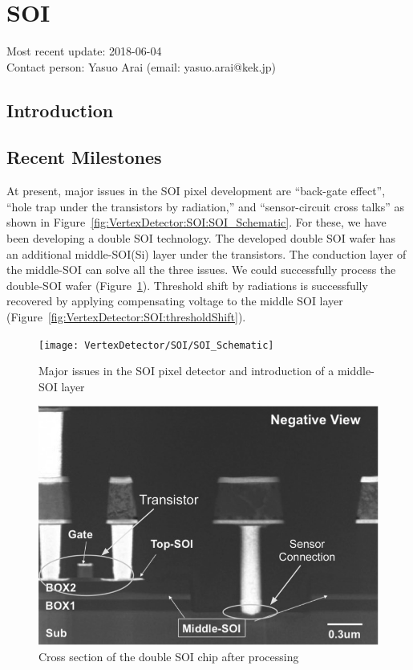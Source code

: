 \section{SOI}
Most recent update: 2018-06-04 \\
Contact person: Yasuo Arai (email: yasuo.arai@kek.jp)
\subsection{Introduction}
\subsection{Recent Milestones}
At present, major issues in the SOI pixel development are ``back-gate effect'', ``hole trap under the transistors by radiation,'' and ``sensor-circuit cross talks'' as shown in Figure~\ref{fig:VertexDetector:SOI:SOI_Schematic}. For these, we have been developing a double SOI technology. The developed double SOI wafer has an additional middle-SOI(Si) layer under the transistors. The conduction layer of the middle-SOI can solve all the three issues. We could successfully process the double-SOI wafer (Figure~\ref{fig:VertexDetector:SOI:crossSectionAfterProcessing}). Threshold shift by radiations is successfully recovered by applying compensating voltage to the middle SOI layer (Figure~\ref{fig:VertexDetector:SOI:thresholdShift}).

\begin{figure}
 \begin{minipage}[t]{0.49\textwidth}
\centering     \texttt{[image: VertexDetector/SOI/SOI\_Schematic]}
\caption{Major issues in the SOI pixel detector and introduction of a middle-SOI layer}
\label{fig:VertexDetector:SOI:SOI_Schematic}
 \end{minipage}
 \hfill
 \begin{minipage}[t]{0.49\textwidth}
 \centering
    \includegraphics*[width=\textwidth,keepaspectratio]{VertexDetector/SOI/crossSectionAfterProcessing}
	\caption{Cross section of the double SOI chip after processing}
	\label{fig:VertexDetector:SOI:crossSectionAfterProcessing}
 \end{minipage}
 \end{figure}

